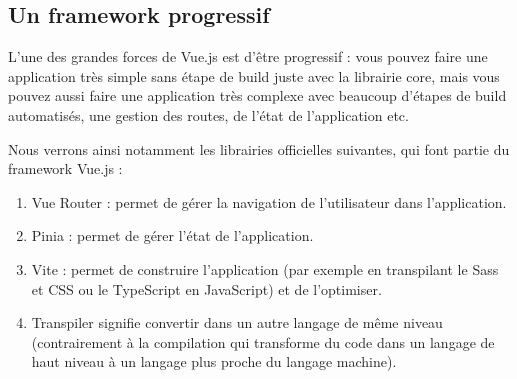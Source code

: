 \subsection{Un framework progressif}
L'une des grandes forces de {\color{monOrange}Vue.js} est d'être progressif : vous pouvez faire une application très simple sans étape de {\color{monOrange}build} juste avec la librairie {\color{monOrange}core}, mais vous pouvez aussi faire une application très complexe avec beaucoup d'étapes de {\color{monOrange}build} automatisés, une gestion des routes, de l'état de l'application etc.

Nous verrons ainsi notamment les librairies officielles suivantes, qui font partie du framework {\color{monOrange}Vue.js} :
\begin{enumerate}
\item {\color{monOrange}Vue Router} : permet de gérer la navigation de l'utilisateur dans l'application.
\item {\color{monOrange}Pinia} : permet de gérer l'état de l'application.
\item {\color{monOrange}Vite} : permet de construire l'application (par exemple en transpilant le {\color{monOrange}Sass} et {\color{monOrange}CSS} ou le {\color{monOrange}TypeScript} en {\color{monOrange}JavaScript}) et de l'optimiser.
\item {\color{monOrange}Transpiler} signifie convertir dans un autre langage de même niveau (contrairement à la compilation qui transforme du code dans un langage de haut niveau à un langage plus proche du langage machine).
\end{enumerate}

